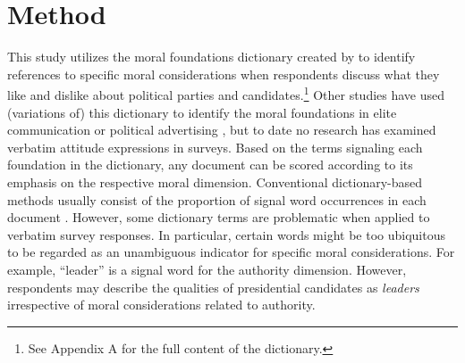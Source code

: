 \section{Method}

This study utilizes the moral foundations dictionary created by \citet{graham2009liberals} to identify references to specific moral considerations when respondents discuss what they like and dislike about political parties and candidates.\footnote{See Appendix A for the full content of the dictionary.} Other studies have used (variations of) this dictionary to identify the moral foundations in elite communication \citep[e.g.,][]{clifford2015concerns} or political advertising \citep[e.g.,][]{lipsitz2017playing}, but to date no research has examined verbatim attitude expressions in surveys. Based on the terms signaling each foundation in the dictionary, any document can be scored according to its emphasis on the respective moral dimension. Conventional dictionary-based methods usually consist of the proportion of signal word occurrences in each document \citep[e.g.,][]{graham2009liberals}. However, some dictionary terms are problematic when applied to verbatim survey responses. In particular, certain words might be too ubiquitous to be regarded as an unambiguous indicator for specific moral considerations. For example, ``leader'' is a signal word for the authority dimension. However, respondents may describe the qualities of presidential candidates as \textit{leaders} irrespective of moral considerations related to authority.

